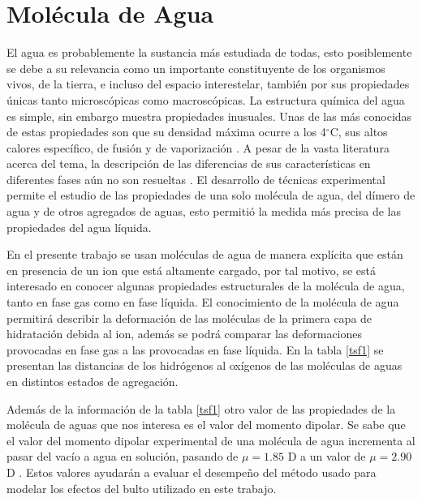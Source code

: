 \section{Mol\'ecula de Agua}
El agua es probablemente la sustancia m\'as estudiada de todas, esto
posiblemente se debe a su relevancia como un importante constituyente
de los organismos vivos, de la tierra, e incluso del espacio 
interestelar, tambi\'en por sus propiedades \'unicas tanto 
microsc\'opicas como macrosc\'opicas. La estructura qu\'imica del 
agua es simple, sin embargo muestra propiedades inusuales. Unas de 
las m\'as conocidas de estas propiedades son que su densidad m\'axima
ocurre a los 4$^{\circ}$C, sus altos calores espec\'ifico, de 
fusi\'on y de vaporizaci\'on \citep{Mori1997}. A pesar de la vasta 
literatura acerca del tema, la descripci\'on de las diferencias de 
sus caracter\'isticas en diferentes fases a\'un no son resueltas 
\citep{Sain2000}. El desarrollo de t\'ecnicas experimental permite el
estudio de las propiedades de una solo mol\'ecula de agua, del 
d\'imero de agua y de otros agregados de aguas, esto permiti\'o la
medida m\'as precisa de las propiedades del agua l\'iquida. 

En el presente trabajo se usan mol\'eculas de agua de manera 
expl\'icita que est\'an en presencia de un ion que est\'a altamente 
cargado, por tal motivo, se est\'a interesado en conocer algunas
propiedades estructurales de la mol\'ecula de agua, tanto en fase gas
como en fase l\'iquida. El conocimiento de la mol\'ecula de agua 
permitir\'a describir la deformaci\'on de las mol\'eculas de la 
primera capa de hidrataci\'on debida al ion, adem\'as se podr\'a 
comparar las deformaciones provocadas en fase gas a las provocadas en
fase l\'iquida. En la tabla \ref{tsf1} se presentan las distancias de
los hidr\'ogenos al ox\'igenos de las mol\'eculas de aguas en 
distintos estados de agregaci\'on. 

Adem\'as de la informaci\'on de la tabla \ref{tsf1} otro valor de las
propiedades de la mol\'ecula de aguas que nos interesa es el valor 
del momento dipolar. Se sabe que el valor del momento dipolar 
experimental de una mol\'ecula de agua incrementa al pasar del 
vac\'io a agua en soluci\'on, pasando de $\mu=1.85$ D 
\citep{Clou1973} a un valor de $\mu=2.90$ D \citep{Bady2000}. Estos
valores ayudar\'an a evaluar el desempe\~no del m\'etodo usado para
modelar los efectos del bulto utilizado en este trabajo.

